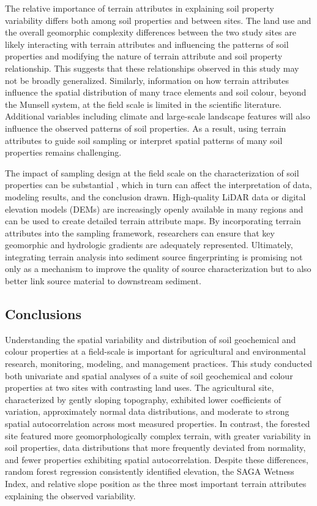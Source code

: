 \documentclass[
  number]{elsarticle}
\begin{document}
The relative importance of terrain attributes in explaining soil
property variability differs both among soil properties and between
sites. The land use and the overall geomorphic complexity differences
between the two study sites are likely interacting with terrain
attributes and influencing the patterns of soil properties and modifying
the nature of terrain attribute and soil property relationship. This
suggests that these relationships observed in this study may not be
broadly generalized. Similarly, information on how terrain attributes
influence the spatial distribution of many trace elements and soil
colour, beyond the Munsell system, at the field scale is limited in the
scientific literature. Additional variables including climate and
large-scale landscape features will also influence the observed patterns
of soil properties. As a result, using terrain attributes to guide soil
sampling or interpret spatial patterns of many soil properties remains
challenging.

The impact of sampling design at the field scale on the characterization
of soil properties can be substantial \citep{lunamiño2024}, which in
turn can affect the interpretation of data, modeling results, and the
conclusion drawn. High-quality LiDAR data or digital elevation models
(DEMs) are increasingly openly available in many regions and can be used
to create detailed terrain attribute maps. By incorporating terrain
attributes into the sampling framework, researchers can ensure that key
geomorphic and hydrologic gradients are adequately represented.
Ultimately, integrating terrain analysis into sediment source
fingerprinting is promising not only as a mechanism to improve the
quality of source characterization but to also better link source
material to downstream sediment.

\subsection{Conclusions}\label{conclusions}

Understanding the spatial variability and distribution of soil
geochemical and colour properties at a field-scale is important for
agricultural and environmental research, monitoring, modeling, and
management practices. This study conducted both univariate and spatial
analyses of a suite of soil geochemical and colour properties at two
sites with contrasting land uses. The agricultural site, characterized
by gently sloping topography, exhibited lower coefficients of variation,
approximately normal data distributions, and moderate to strong spatial
autocorrelation across most measured properties. In contrast, the
forested site featured more geomorphologically complex terrain, with
greater variability in soil properties, data distributions that more
frequently deviated from normality, and fewer properties exhibiting
spatial autocorrelation. Despite these differences, random forest
regression consistently identified elevation, the SAGA Wetness Index,
and relative slope position as the three most important terrain
attributes explaining the observed variability.
\end{document}
